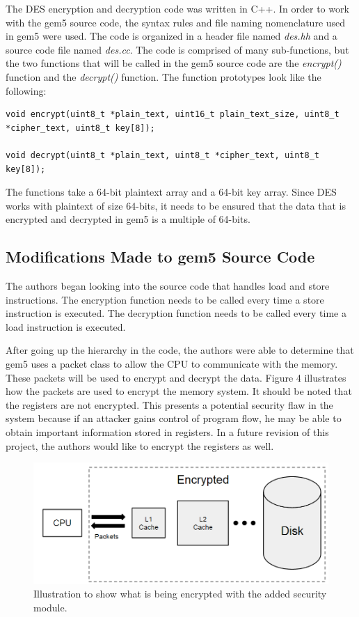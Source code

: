 \documentclass[letterpaper, 10pt, conference]{ieeeconf}  %
\begin{document}
The DES encryption and decryption code was written in C++.  In order to work with the gem5 source code, the syntax rules and file naming nomenclature used in gem5 were used.  The code is organized in a header file named \emph{des.hh} and a source code file named \emph{des.cc}.  The code is comprised of many sub-functions, but the two functions that will be called in the gem5 source code are the \emph{encrypt()} function and the \emph{decrypt()} function.  The function prototypes look like the following:

\begin{lstlisting}
void encrypt(uint8_t *plain_text, uint16_t plain_text_size, uint8_t *cipher_text, uint8_t key[8]);

void decrypt(uint8_t *plain_text, uint8_t *cipher_text, uint8_t key[8]);
\end{lstlisting}

The functions take a 64-bit plaintext array and a 64-bit key array.  Since DES works with plaintext of size 64-bits, it needs to be ensured that the data that is encrypted and decrypted in gem5 is a multiple of 64-bits.

\subsection{Modifications Made to gem5 Source Code}

The authors began looking into the source code that handles load and store instructions.  The encryption function needs to be called every time a store instruction is executed.  The decryption function needs to be called every time a load instruction is executed.

After going up the hierarchy in the code, the authors were able to determine that gem5 uses a packet class to allow the CPU to communicate with the memory.  These packets will be used to encrypt and decrypt the data.  Figure 4 illustrates how the packets are used to encrypt the memory system.  It should be noted that the registers are not encrypted.  This presents a potential security flaw in the system because if an attacker gains control of program flow, he may be able to obtain important information stored in registers.  In a future revision of this project, the authors would like to encrypt the registers as well.

\begin{figure}[thpb]
	\centering
	\includegraphics[scale=.35]{gem5}
   \caption{Illustration to show what is being encrypted with the added security module.}
\end{figure}
\end{document}
